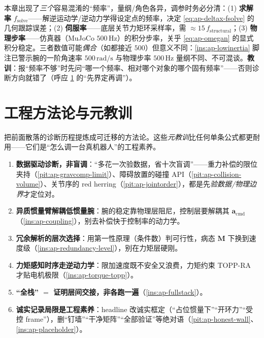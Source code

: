 \begin{pitfall}\label{pit:ap-three-rates}
本章出现了\emph{三个}容易混淆的“频率”，量纲/角色各异，调参时务必分清：(1) \textbf{求解率} $f_{\mathrm{solve}}$——解逆运动学/逆动力学得设定点的频率，决定 \cref{eq:ap-deltax-fsolve} 的几何跟踪误差；(2) \textbf{伺服率}——底层关节力矩环采样率，需 $\approx15\,f_{\mathrm{structural}}$；(3) \textbf{物理步率}——仿真器（MuJoCo $500\,\mathrm{Hz}$）的积分步率，关乎 \cref{eq:ap-omegan} 的显式积分稳定。三者数值可能\emph{偶合}（如都接近 $500$）但意义不同：\cref{ins:ap-lowinertia} 脚注已警示腕的一阶角速率 $500\,\mathrm{rad/s}$ 与物理步率 $500\,\mathrm{Hz}$ 量纲不同、不可混谈。\textbf{教训}：报“频率不够”时先问“哪一个频率、相对哪个对象的哪个固有频率”——否则诊断方向就错了（呼应 \cref{sec:ap-methodology} 的“先界定再调”）。
\end{pitfall}

\section{工程方法论与元教训}
\label{sec:ap-methodology}

把前面散落的诊断历程提炼成可迁移的方法论。这些\emph{元教训}比任何单条公式都更耐用——它们是“怎么调一台真机器人”的工程素养。

\begin{insight}[六条元教训]\label{ins:ap-metalessons}
\begin{enumerate}
  \item \textbf{数据驱动诊断，非盲调}：“多花一次验数据，省十次盲调”——重力补偿的限位夹持（\cref{pit:ap-gravcomp-limit}）、障碍放置的碰撞 API（\cref{pit:ap-collision-volume}）、关节序的 red herring（\cref{pit:ap-jointorder}），都是先\emph{验数据/物理边界}才定位对。
  \item \textbf{异质惯量臂解耦低惯量腕}：腕的稳定靠物理层阻尼，控制层要解耦其 $\mathbf{a}_{\mathrm{cmd}}$（\cref{ins:ap-coupling}），别去补偿快于控制率的动力学。
  \item \textbf{冗余解析的层次选择}：用第一性原理（条件数）判可行性，病态 $\mathbf{M}$ 下换到速度级（\cref{ins:ap-redundancy-level}），别在力矩层硬刚。
  \item \textbf{力矩感知时序走逆动力学}：限加速度既不安全又浪费，力矩约束 TOPP-RA 才贴电机极限（\cref{ins:ap-torque-topp}）。
  \item \textbf{“全栈” $=$ 证明层间交接，非各跑一遍}（\cref{ins:ap-fullstack}）。
  \item \textbf{诚实记录局限是工程素养}：headline 改诚实框定（“占位惯量下”“开环力”“受控 frame”），删“钉墙”“干净矩阵”“全部验证”等绝对语（\cref{pit:ap-honest-wall}、\cref{ins:ap-placeholder}）。
\end{enumerate}
\end{insight}


